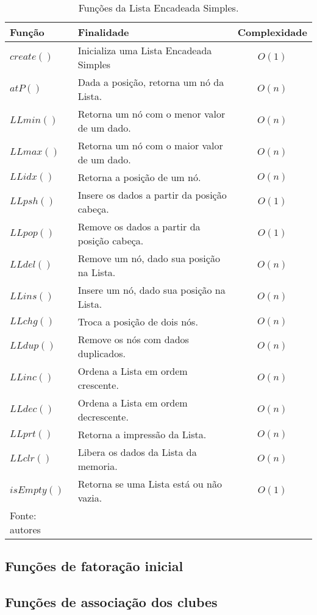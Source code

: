 \documentclass[12pt,a4paper]{article}
\begin{document}
\begin{table}[H]
	\centering
	\caption{Funções da Lista Encadeada Simples.}
	\label{tab:funcoes}
	\begin{tabular}{llc}
		\toprule 
		Função & Finalidade & Complexidade \\ 
		\midrule
		$create()$ & Inicializa uma Lista Encadeada Simples & $O(1)$ \\
		$atP()$ & Dada a posição, retorna um nó da Lista. & $O(n)$ \\
		$LLmin()$ & Retorna um nó com o menor valor de um dado. & $O(n)$ \\
		$LLmax()$ & Retorna um nó com o maior valor de um dado. & $O(n)$ \\
		$LLidx()$ & Retorna a posição de um nó. & $O(n)$ \\
		$LLpsh()$ & Insere os dados a partir da posição cabeça. & $O(1)$ \\
		$LLpop()$ & Remove os dados a partir da posição cabeça. & $O(1)$ \\
		$LLdel()$ & Remove um nó, dado sua posição na Lista. & $O(n)$ \\
		$LLins()$ & Insere um nó, dado sua posição na Lista. & $O(n)$ \\
		$LLchg()$ & Troca a posição de dois nós. & $O(n)$ \\
		$LLdup()$ & Remove os nós com dados duplicados. & $O(n)$ \\
		$LLinc()$ & Ordena a Lista em ordem crescente. & $O(n)$ \\
		$LLdec()$ & Ordena a Lista em ordem decrescente. & $O(n)$ \\
		$LLprt()$ & Retorna a impressão da Lista. & $O(n)$ \\
		$LLclr()$ & Libera os dados da Lista da memoria. & $O(n)$ \\
		$isEmpty()$ & Retorna se uma Lista está ou não vazia. & $O(1)$ \\
		\bottomrule
		\footnotesize Fonte: autores
	\end{tabular}
\end{table}

\subsection{Funções de fatoração inicial}

\subsection{Funções de associação dos clubes}
\end{document}
